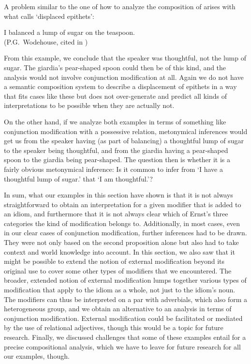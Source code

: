 \documentclass[output=paper]{langsci/langscibook}
\begin{document}
A problem similar to the one of how to analyze the composition of  arises with what \citet[66]{ernst81} calls `displaced epithets':

\ea
I balanced a \underline{} lump of sugar on the teaspoon. \\
(P.G.\ Wodehouse, cited in \citealt{Hall73})
\z

\noindent From this example, we conclude that the speaker was thoughtful, not the lump of sugar. The giardia's pear-shaped spoon could then be of this kind, and the analysis would not involve conjunction modification at all. Again we do not have a semantic composition system to describe a displacement of epithets in a way that fits cases like these but does not over-generate and predict all kinds of interpretations to be possible when they are actually not. 

On the other hand, if we analyze both examples in terms of something like conjunction modification with a possessive relation, metonymical inferences would get us from the speaker having (as part of balancing) a thoughtful lump of sugar to the speaker being thoughtful, and from the giardia having a pear-shaped spoon to the giardia being pear-shaped. The question then is whether it is a fairly obvious metonymical inference: Is it common to infer from `I have a thoughtful lump of sugar.' that `I am thoughtful.'?

In sum, what our examples in this section have shown is that it is not always straightforward to obtain an interpretation for a given modifier that is added to an idiom, and furthermore that it is not always clear which of Ernst's three categories the kind of modification belongs to. Additionally, in most cases, even in our clear cases of conjunction modification, further inferences had to be drawn. They were not only based on the second proposition alone but also had to take context and world knowledge into account. In this section, we also saw that it might be possible to extend the notion of external modification beyond its original use to cover some other types of modifiers that we encountered. The broader, extended notion of external modification lumps together various types of modification that apply to the idiom as a whole, not just to the idiom's noun. The modifiers can thus be interpreted on a par with adverbials, which also form a heterogeneous group, and we obtain an alternative to an analysis in terms of conjunction modification. External modification could be facilitated or mediated by the use of relational adjectives, though this would be a topic for future research. Finally, we discussed challenges that some of these examples entail for a precise compositional analysis, which we have to leave for future research for all our examples, though.
\end{document}
